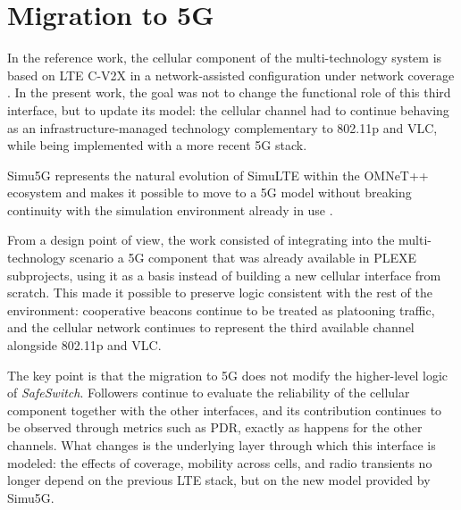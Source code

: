 \section{Migration to 5G}
\label{sec:s5g_5g}

In the reference work, the cellular component of the multi-technology system is based on LTE C-V2X in a network-assisted configuration under network coverage \cite{segata2023multi-technology,3gpp-21914-1400}. In the present work, the goal was not to change the functional role of this third interface, but to update its model: the cellular channel had to continue behaving as an infrastructure-managed technology complementary to 802.11p and VLC, while being implemented with a more recent 5G stack.

Simu5G represents the natural evolution of SimuLTE within the OMNeT++ ecosystem and makes it possible to move to a 5G model without breaking continuity with the simulation environment already in use \cite{virdis2014simulte,nardini2020simu5g}.

From a design point of view, the work consisted of integrating into the multi-technology scenario a 5G component that was already available in PLEXE subprojects, using it as a basis instead of building a new cellular interface from scratch. This made it possible to preserve logic consistent with the rest of the environment: cooperative beacons continue to be treated as platooning traffic, and the cellular network continues to represent the third available channel alongside 802.11p and VLC.

The key point is that the migration to 5G does not modify the higher-level logic of \emph{SafeSwitch}. Followers continue to evaluate the reliability of the cellular component together with the other interfaces, and its contribution continues to be observed through metrics such as PDR, exactly as happens for the other channels. What changes is the underlying layer through which this interface is modeled: the effects of coverage, mobility across cells, and radio transients no longer depend on the previous LTE stack, but on the new model provided by Simu5G.
